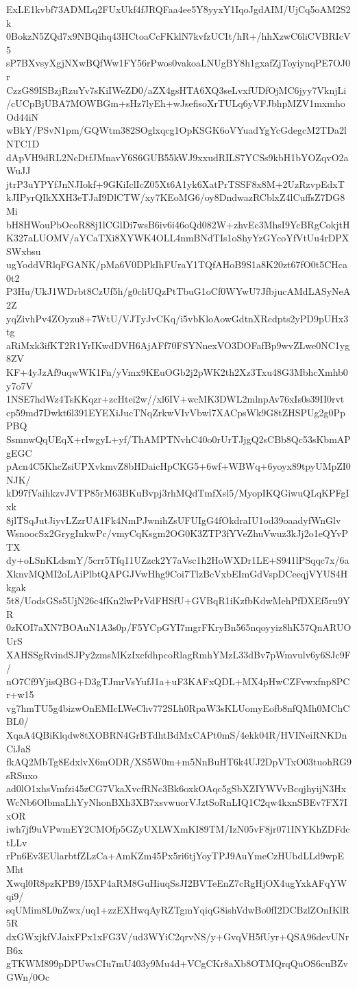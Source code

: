 ExLE1kvbf73ADMLq2FUxUkf4fJRQFaa4ee5Y8yyxY1IqoJgdAIM/UjCq5oAM2S2k
0BokzN5ZQd7x9NBQihq43HCtoaCcFKklN7kvfzUCIt/hR+/hhXzwC6liCVBRIcV5
sP7BXvsyXgjNXwBQfWw1FY56rPwos0vakoaLNUgBY8h1gxafZjToyiynqPE7OJ0r
CzzG89ISBzjRzuYv7sKiIWeZD0/aZX4gsHTA6XQ3seLvxfUDfOjMC6jyy7VknjLi
/cUCpBjUBA7MOWBGm+sHz7lyEh+wJsefisoXrTULq6yVFJbhpMZV1mxmhoOd44iN
wBkY/PSvN1pm/GQWtm382SOglxqcg1OpKSGK6oVYuadYgYcGdegcM2TDa2lNTC1D
dApVH9dRL2NcDtfJMnavY6S6GUB55kWJ9xxudRILS7YCSs9kbH1bYOZqvO2aWuJJ
jtrP3uYPYfJnNJIokf+9GKiIclIcZ05Xt6A1yk6XatPrTSSF8x8M+2UzRzvpEdxT
kJIPyrQIkXXH3eTJaI9DlCTW/xy7KEoMG6/oy8DndwazRCblxZ4lCuffsZ7DG8Mi
bH8HWouPbOcoR88j1lCGlDi7wsB6iv6i46oQd082W+zhvEc3MhsI9YcBRgCokjtH
K327aLUOMV/aYCaTXi8XYWK4OLL4nmBNdTIs1oShyYzGYcoYfVtUu4rDPXSWxbsu
ugYoddVRlqFGANK/pMa6V0DPkIhFUraY1TQfAHoB9S1a8K20zt67fO0t5CHca0t2
P3Hu/UkJ1WDrbt8CzUf5h/g0cliUQzPtTbuG1oCf0WYwU7JfbjucAMdLASyNeA2Z
yqZivhPv4ZOyzu8+7WtU/VJTyJvCKq/i5vbKloAowGdtnXRcdpts2yPD9pUHx3tg
aRiMxk3ifKT2R1YrIKwdDVH6AjAFf70FSYNnexVO3DOFafBp9wvZLwe0NC1yg8ZV
KF+4yJzAf9uqwWK1Fn/yVmx9KEuOGb2j2pWK2th2Xz3Txu48G3MbhcXmhb0y7o7V
1NSE7hdWz4TsKKqzr+zcHtei2w//xl6IV+wcMK3DWL2mlnpAv76xIs0s39II0rvt
cp59md7Dwkt6l391EYEXiJucTNqZrkwVIvVbwl7XACpsWk9G8tZHSPUg2g0PpPBQ
SsmnwQqUEqX+rIwgyL+yf/ThAMPTNvhC40o0rUrTJjgQ2sCBb8Qc53sKbmAPgEGC
pAcn4C5KhcZsiUPXvkmvZ8bHDaicHpCKG5+6wf+WBWq+6yoyx89tpyUMpZI0NJK/
kD97fVaihkzvJVTP85rM63BKuBvpj3rhMQdTmfXsl5/MyopIKQGiwuQLqKPFgIxk
8jlTSqJutJiyvLZzrUA1Fk4NmPJwnihZsUFUIgG4fOkdraIU1od39oaadyfWnGlv
WsnoocSx2GrygInkwPc/vmyCqKsgm2OG0K3ZTP3fYVeZhuVwuz3kJj2o1eQYvPTX
dy+oLSnKLdsmY/5crr5Tfq11UZzck2Y7aVsc1h2HoWXDr1LE+S941lPSqqc7x/6a
XknvMQMI2oLAiPlbtQAPGJVwHhg9Coi7TlzBcVxbEImGdVspDCeeqjVYUS4Hkgak
5t8/UodsGSs5UjN26c4fKn2lwPrVdFHSfU+GVBqR1iKzfbKdwMehPfDXEf5ru9YR
0zKOI7aXN7BOAuN1A3s0p/F5YCpGYI7mgrFKryBn565nqoyyiz8hK57QnARUOUrS
XAHSSgRvindSJPy2zmsMKzIxcfdhpcoRlagRmhYMzL33dBv7pWmvulv6y6SJc9F/
nO7Cf9YjisQBG+D3gTJmrVsYufJ1a+uF3KAFxQDL+MX4pHwCZFvwxfnp8PCr+w15
vg7hmTU5g4bizwOnEMIcLWeChv772SLh0RpaW3sKLUomyEofb8nfQMh0MChCBL0/
XqaA4QBiKlqdw8tXOBRN4GrBTdhtBdMxCAPt0mS/4ekk04R/HVINeiRNKDnCiJaS
fkAQ2MbTg8EdxlvX6mODR/XS5W0m+m5NnBuHT6k4UJ2DpVTxO03tuohRG9sRSuxo
ad0lO1xhsVmfzi45zCG7VkaXvcfRNc3Bk6oxkOAqc5gSbXZIYWVvBcqjhyijN3Hx
WcNb6OlbmaLhYyNhonBXh3XB7xsvwuorVJztSoRnLIQ1C2qw4kxnSBEv7FX7IxOR
iwh7jf9uVPwmEY2CMOfp5GZyUXLWXmKI89TM/IzN05vF8jr071INYKhZDFdctLLv
rPn6Ev3EUlarbtfZLzCa+AmKZm45Px5ri6tjYoyTPJ9AuYmeCzHUbdLLd9wpEMht
Xwql0R8pzKPB9/I5XP4aRM8GuHiuqSsJI2BVTeEnZ7cRgHjOX4ugYxkAFqYWqi9/
sqUMim8L0nZwx/uq1+zzEXHwqAyRZTgmYqiqG8ishVdwBo0fI2DCBzlZOnIKlR5R
dxGWxjkfVJaixFPx1xFG3V/ud3WYiC2qrvNS/y+GvqVH5fUyr+QSA96devUNrB6x
gTKWM899pDPUwsCIu7mU403y9Mu4d+VCgCKr8aXb8OTMQrqQuOS6cuBZvGWn/0Oc
